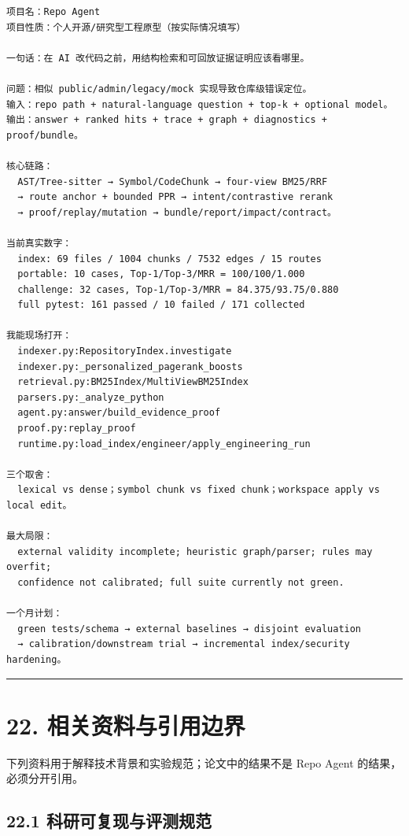 \documentclass[UTF8,12pt,openany]{ctexbook}
\begin{document}
\begin{lstlisting}
项目名：Repo Agent
项目性质：个人开源/研究型工程原型（按实际情况填写）

一句话：在 AI 改代码之前，用结构检索和可回放证据证明应该看哪里。

问题：相似 public/admin/legacy/mock 实现导致仓库级错误定位。
输入：repo path + natural-language question + top-k + optional model。
输出：answer + ranked hits + trace + graph + diagnostics + proof/bundle。

核心链路：
  AST/Tree-sitter → Symbol/CodeChunk → four-view BM25/RRF
  → route anchor + bounded PPR → intent/contrastive rerank
  → proof/replay/mutation → bundle/report/impact/contract。

当前真实数字：
  index: 69 files / 1004 chunks / 7532 edges / 15 routes
  portable: 10 cases, Top-1/Top-3/MRR = 100/100/1.000
  challenge: 32 cases, Top-1/Top-3/MRR = 84.375/93.75/0.880
  full pytest: 161 passed / 10 failed / 171 collected

我能现场打开：
  indexer.py:RepositoryIndex.investigate
  indexer.py:_personalized_pagerank_boosts
  retrieval.py:BM25Index/MultiViewBM25Index
  parsers.py:_analyze_python
  agent.py:answer/build_evidence_proof
  proof.py:replay_proof
  runtime.py:load_index/engineer/apply_engineering_run

三个取舍：
  lexical vs dense；symbol chunk vs fixed chunk；workspace apply vs local edit。

最大局限：
  external validity incomplete; heuristic graph/parser; rules may overfit;
  confidence not calibrated; full suite currently not green.

一个月计划：
  green tests/schema → external baselines → disjoint evaluation
  → calibration/downstream trial → incremental index/security hardening。
\end{lstlisting}

\hrule

\section{22. 相关资料与引用边界}

下列资料用于解释技术背景和实验规范；论文中的结果不是 Repo Agent 的结果，必须分开引用。\par

\subsection{22.1 科研可复现与评测规范}
\end{document}
